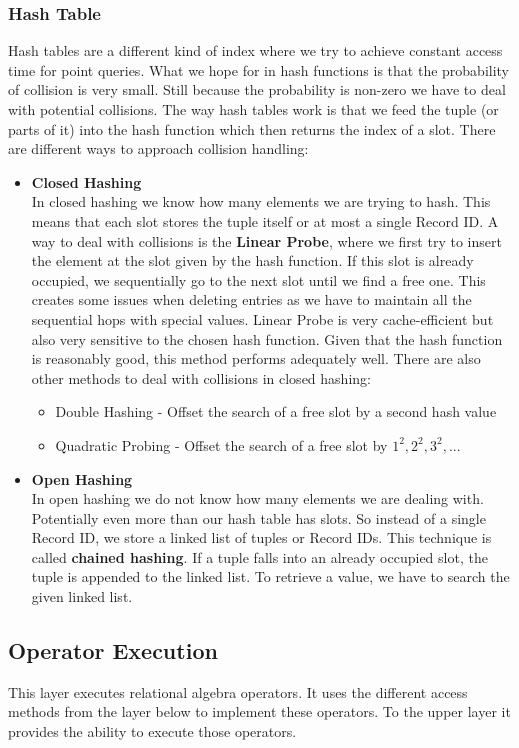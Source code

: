 \subsubsection{Hash Table}
Hash tables are a different kind of index where we try to achieve constant access time for point queries. What we hope for in hash functions is that the probability of collision is very small. Still because the probability is non-zero we have to deal with potential collisions. The way hash tables work is that we feed the tuple (or parts of it) into the hash function which then returns the index of a slot. There are different ways to approach collision handling:
\begin{itemize}
\item \textbf{Closed Hashing}\\
In closed hashing we know how many elements we are trying to hash. This means that each slot stores the tuple itself or at most a single Record ID. A way to deal with collisions is the \textbf{Linear Probe}, where we first try to insert the element at the slot given by the hash function. If this slot is already occupied, we sequentially go to the next slot until we find a free one. This creates some issues when deleting entries as we have to maintain all the sequential hops with special values. Linear Probe is very cache-efficient but also very sensitive to the chosen hash function. Given that the hash function is reasonably good, this method performs adequately well. There are also other methods to deal with collisions in closed hashing:
\begin{itemize}
\item Double Hashing - Offset the search of a free slot by a second hash value
\item Quadratic Probing - Offset the search of a free slot by $1^2, 2^2, 3^2, ...$
\end{itemize}
\item \textbf{Open Hashing}\\
In open hashing we do not know how many elements we are dealing with. Potentially even more than our hash table has slots. So instead of a single Record ID, we store a linked list of tuples or Record IDs. This technique is called \textbf{chained hashing}. If a tuple falls into an already occupied slot, the tuple is appended to the linked list. To retrieve a value, we have to search the given linked list.
\end{itemize}

\subsection{Operator Execution}
This layer executes relational algebra operators. It uses the different access methods from the layer below to implement these operators. To the upper layer it provides the ability to execute those operators.

